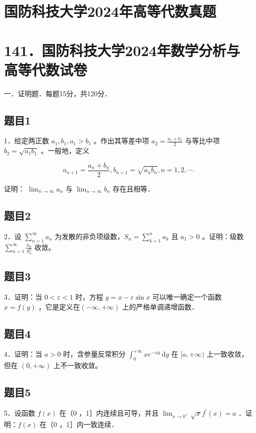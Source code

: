 \documentclass{article}
\begin{document}
\section*{国防科技大学2024年高等代数真题}
\section*{141．国防科技大学2024年数学分析与高等代数试卷}
一．证明题．每题15分，共120分．\\

\subsection{题目1}
1．给定两正数 \(a_{1}, b_{1}, a_{1}>b_{1}\) 。作出其等差中项 \(a_{2}=\frac{a_{1}+b_{1}}{2}\) 与等比中项 \(b_{2}=\sqrt{a_{1} b_{1}}\) 。一般地，定义

\[
a_{n+1}=\frac{a_{n}+b_{n}}{2}, b_{n+1}=\sqrt{a_{n} b_{n}}, n=1,2, \cdots .
\]

证明： \(\lim _{n \rightarrow \infty} a_{n}\) 与 \(\lim _{n \rightarrow \infty} b_{n}\) 存在且相等．

\subsection{题目2}
2．设 \(\sum_{n=1}^{\infty} a_{n}\) 为发散的非负项级数，\(S_{n}=\sum_{k=1}^{n} a_{k}\) 且 \(a_{1}>0\) 。证明：级数 \(\sum_{n=1}^{\infty} \frac{a_{n}}{S_{n}^{2}}\) 收敛。

\subsection{题目3}
3．证明：当 \(0<\varepsilon<1\) 时，方程 \(y=x-\varepsilon \sin x\) 可以唯一确定一个函数 \(x=f(y)\) ，它是定义在\((-\infty,+\infty)\) 上的严格单调递增函数．

\subsection{题目4}
4．证明：当 \(a>0\) 时，含参量反常积分 \(\int_{0}^{+\infty} x e^{-x y} \mathrm{~d} y\) 在 \([a,+\infty)\) 上一致收敛，但在 \((0,+\infty)\) 上不一致收敛。

\subsection{题目5}
5．设函数 \(f(x)\) 在（0 ，1］内连续且可导，并且 \(\lim _{x \rightarrow 0^{+}} \sqrt{x} f^{\prime}(x)=a\) ．证明：\(f(x)\) 在（0 ，1］内一致连续．
\end{document}
